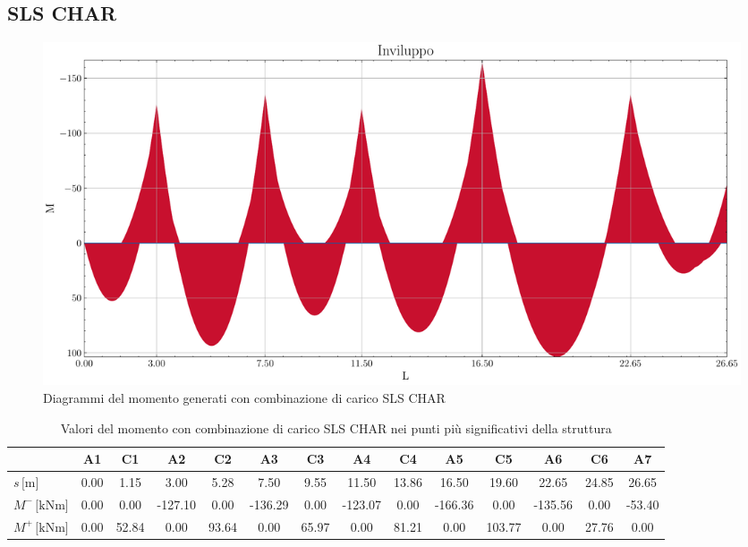 \begin{landscape}
\subsection{SLS CHAR}
\begin{figure}[H]
\centering
\includegraphics[height=0.6\textwidth]{IMG/diagrammi_trave/SLS_CHAR_M.pdf}
\caption{Diagrammi del momento generati con combinazione di carico SLS CHAR}
\label{fig:trave_SLS_CHAR_momento}
\end{figure}
\begin{table}[H]
\footnotesize
\centering
\caption{Valori del momento con combinazione di carico SLS CHAR nei punti più significativi della struttura}
\label{tab:trave_SLS_CHAR_momento}
	\begin{tabular}{lS[table-format=-3.2]S[table-format=-3.2]S[table-format=-3.2]S[table-format=-3.2]S[table-format=-3.2]S[table-format=-3.2]S[table-format=-3.2]S[table-format=-3.2]S[table-format=-3.2]S[table-format=-3.2]S[table-format=-3.2]S[table-format=-3.2]S[table-format=-3.2]}
		\toprule
		{} & {A1} & {C1} & {A2} & {C2} & {A3} & {C3} & {A4} & {C4} & {A5} & {C5} & {A6} & {C6} & {A7} \\
		\midrule
		$s\,\si{[\metre]}$ & 0.00 & 1.15 & 3.00 & 5.28 & 7.50 & 9.55 & 11.50 & 13.86 & 16.50 & 19.60 & 22.65 & 24.85 & 26.65 \\
        $M^{-}\,\si{[\kilo\newton\metre]}$ & 0.00 & 0.00 & -127.10 & 0.00 & -136.29 & 0.00 & -123.07 & 0.00 & -166.36 & 0.00 & -135.56 & 0.00 & -53.40 \\
        $M^{+}\,\si{[\kilo\newton\metre]}$ & 0.00 & 52.84 & 0.00 & 93.64 & 0.00 & 65.97 & 0.00 & 81.21 & 0.00 & 103.77 & 0.00 & 27.76 & 0.00 \\
		\bottomrule
	\end{tabular}
\end{table}
\clearpage

\end{landscape}
